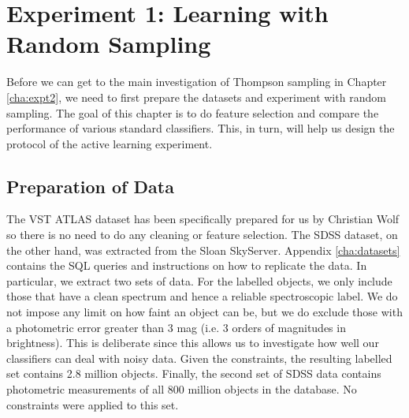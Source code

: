 
\chapter{Experiment 1: Learning with Random Sampling}
\label{cha:expt1}

Before we can get to the main investigation of Thompson sampling in Chapter \ref{cha:expt2},
we need to first prepare the datasets and experiment with random sampling. The goal of
this chapter is to do feature selection and compare the performance of various standard
classifiers. This, in turn, will help us design the protocol
of the active learning experiment.

\section{Preparation of Data}

The VST ATLAS dataset has been specifically prepared for us by Christian Wolf so there
is no need to do any cleaning or feature selection.
The SDSS dataset, on the other hand, was extracted from the Sloan SkyServer. Appendix
\ref{cha:datasets} contains the SQL queries and instructions on how to replicate
the data. In particular, we extract two sets of data.
For the labelled objects, we only include those that have a clean
spectrum and hence a reliable spectroscopic label. We do not impose any limit on how faint
an object can be, but we do exclude those with a photometric error greater than 3 mag (i.e.
3 orders of magnitudes in brightness). This is deliberate since this allows us to 
investigate how well our classifiers can deal with noisy data.
Given the constraints, the resulting labelled set contains
2.8 million objects. Finally, the second set of SDSS data contains photometric measurements
of all 800 million objects in the database. No constraints were applied to this set.

